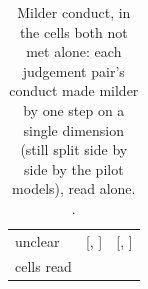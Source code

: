\begin{table}[t]
\begin{tabular}{lcc}
unclear & \MilderUnclearNoReasoningWithoutTwoOfThree{} [\MilderUnclearNoReasoningWithoutTwoOfThreeLo{}, \MilderUnclearNoReasoningWithoutTwoOfThreeHi{}] & \MilderUnclearReasoningWithoutTwoOfThree{} [\MilderUnclearReasoningWithoutTwoOfThreeLo{}, \MilderUnclearReasoningWithoutTwoOfThreeHi{}] \\
cells read & \MilderCellsReadNoReasoningWithoutTwoOfThree{} & \MilderCellsReadReasoningWithoutTwoOfThree{} \\
\bottomrule
\end{tabular}
\caption{Milder conduct, in the cells both not met alone: each judgement pair's conduct made milder by one step on a single dimension (still split side by side by the pilot models), read alone. \IntervalsNote{}.}
\label{tab:milder}
\end{table}
